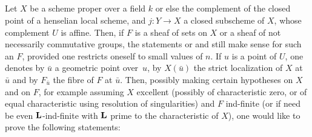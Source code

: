 \subsection{} \label{XIV.6.2}
Let $X$ be a scheme proper over a field $k$ or else the complement of the closed point of a henselian local scheme, and $j:Y \to X$ a closed subscheme of $X$, whose complement $U$ is affine. Then, if $F$ is a sheaf of sets on $X$ or a sheaf of not necessarily commutative groups, the statements  or  and  still make sense for such an $F$, provided one restricts oneself to small values of $n$. If $u$ is a point of $U$, one denotes by $\bar{u}$ a geometric point over~$u$, by $X(\bar{u})$ the strict localization of $X$ at $\bar{u}$ and by $F_{\bar{u}}$ the fibre of $F$ at $\bar{u}$. Then, possibly making certain hypotheses on $X$ and on $F$, for example assuming $X$ excellent (possibly of characteristic zero, or of equal characteristic using resolution of singularities) and $F$ ind-finite (or if need be even $\mathbf{L}$-ind-finite with $\mathbf{L}$ prime to the characteristic of $X$), one would like to prove the following statements:
